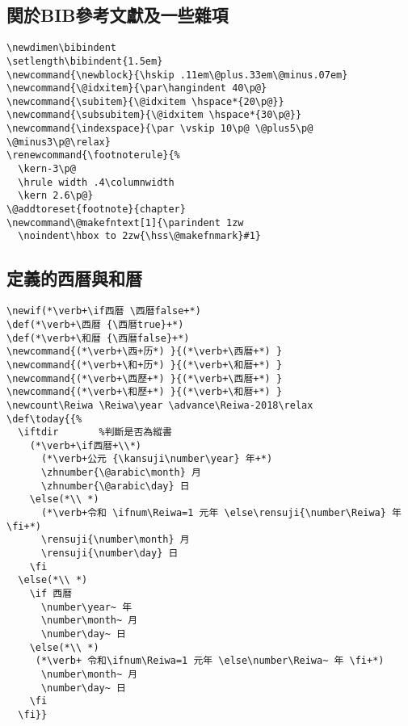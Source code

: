 \subsection{関於BIB參考文獻及一些雜項}

\begin{lstlisting}[firstnumber=1363]
\newdimen\bibindent
\setlength\bibindent{1.5em}
\newcommand{\newblock}{\hskip .11em\@plus.33em\@minus.07em}
\newcommand{\@idxitem}{\par\hangindent 40\p@}
\newcommand{\subitem}{\@idxitem \hspace*{20\p@}}
\newcommand{\subsubitem}{\@idxitem \hspace*{30\p@}}
\newcommand{\indexspace}{\par \vskip 10\p@ \@plus5\p@ \@minus3\p@\relax}
\renewcommand{\footnoterule}{%
  \kern-3\p@
  \hrule width .4\columnwidth
  \kern 2.6\p@}
\@addtoreset{footnote}{chapter}
\newcommand\@makefntext[1]{\parindent 1zw
  \noindent\hbox to 2zw{\hss\@makefnmark}#1}
\end{lstlisting}


\subsection{定義的西暦與和暦}

\begin{lstlisting}[firstnumber=1379]
\newif(*\verb+\if西暦 \西暦false+*)
\def(*\verb+\西暦 {\西暦true}+*)
\def(*\verb+\和暦 {\西暦false}+*)
\newcommand{(*\verb+\西+历*) }{(*\verb+\西暦+*) }
\newcommand{(*\verb+\和+历*) }{(*\verb+\和暦+*) }
\newcommand{(*\verb+\西歷+*) }{(*\verb+\西暦+*) }
\newcommand{(*\verb+\和歷+*) }{(*\verb+\和暦+*) }
\newcount\Reiwa \Reiwa\year \advance\Reiwa-2018\relax
\def\today{{%
  \iftdir		%判斷是否為縱書
    (*\verb+\if西暦+\\*)
      (*\verb+公元 {\kansuji\number\year} 年+*)
      \zhnumber{\@arabic\month} 月
      \zhnumber{\@arabic\day} 日
    \else(*\\ *)
      (*\verb+令和 \ifnum\Reiwa=1 元年 \else\rensuji{\number\Reiwa} 年 \fi+*)
      \rensuji{\number\month} 月
      \rensuji{\number\day} 日
    \fi
  \else(*\\ *)
    \if 西暦
      \number\year~ 年
      \number\month~ 月
      \number\day~ 日
    \else(*\\ *)
     (*\verb+ 令和\ifnum\Reiwa=1 元年 \else\number\Reiwa~ 年 \fi+*)
      \number\month~ 月
      \number\day~ 日
    \fi
  \fi}}
\end{lstlisting}

